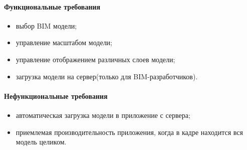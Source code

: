 \paragraph{Функциональные требования}
\begin{itemize}
    \item выбор BIM модели;
    \item управление масштабом модели;
    \item управление отображением различных слоев модели;
    \item загрузка модели на сервер(только для BIM-разработчиков).
\end{itemize}

\paragraph{Нефункциональные требования}
\begin{itemize}
    \item автоматическая загрузка модели в приложение с сервера;
    \item  приемлемая производительность приложения, когда в кадре находится вся модель целиком.
\end{itemize}
